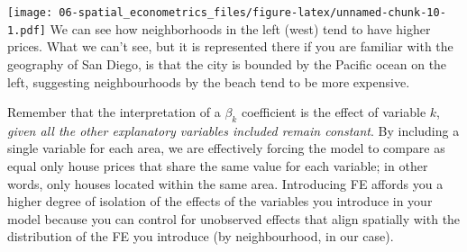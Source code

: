 \documentclass[
]{book}
\newenvironment{Shaded}{\begin{snugshade}}{\end{snugshade}}
\newcommand{\AttributeTok}[1]{\textcolor[rgb]{0.77,0.63,0.00}{#1}}
\newcommand{\CommentTok}[1]{\textcolor[rgb]{0.56,0.35,0.01}{\textit{#1}}}
\newcommand{\FunctionTok}[1]{\textcolor[rgb]{0.00,0.00,0.00}{#1}}
\newcommand{\NormalTok}[1]{#1}
\newcommand{\OtherTok}[1]{\textcolor[rgb]{0.56,0.35,0.01}{#1}}
\newcommand{\SpecialCharTok}[1]{\textcolor[rgb]{0.00,0.00,0.00}{#1}}
\newcommand{\StringTok}[1]{\textcolor[rgb]{0.31,0.60,0.02}{#1}}
\begin{document}
\begin{Shaded}
\end{Shaded}

\texttt{[image: 06-spatial\_econometrics\_files/figure-latex/unnamed-chunk-10-1.pdf]}
We can see how neighborhoods in the left (west) tend to have higher prices. What we can't see, but it is represented there if you are familiar with the geography of San Diego, is that the city is bounded by the Pacific ocean on the left, suggesting neighbourhoods by the beach tend to be more expensive.

Remember that the interpretation of a \(\beta_k\) coefficient is the effect of variable \(k\), \emph{given all the other explanatory variables included remain constant}. By including a single variable for each area, we are effectively forcing the model to compare as equal only house prices that share the same value for each variable; in other words, only houses located within the same area. Introducing FE affords you a higher degree of isolation of the effects of the variables you introduce in your model because you can control for unobserved effects that align spatially with the distribution of the FE you introduce (by neighbourhood, in our case).
\end{document}
